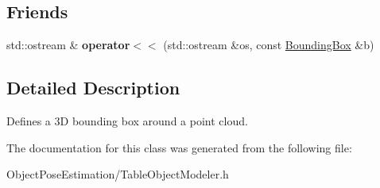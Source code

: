\subsection*{Friends}
\begin{DoxyCompactItemize}
\item 
\hypertarget{classope_1_1_bounding_box_af049bc89fced9364b7d6e2042766a87e}{std\-::ostream \& {\bfseries operator$<$$<$} (std\-::ostream \&os, const \hyperlink{classope_1_1_bounding_box}{Bounding\-Box} \&b)}\label{classope_1_1_bounding_box_af049bc89fced9364b7d6e2042766a87e}

\end{DoxyCompactItemize}


\subsection{Detailed Description}
Defines a 3\-D bounding box around a point cloud. 

The documentation for this class was generated from the following file\-:\begin{DoxyCompactItemize}
\item 
Object\-Pose\-Estimation/Table\-Object\-Modeler.\-h\end{DoxyCompactItemize}
